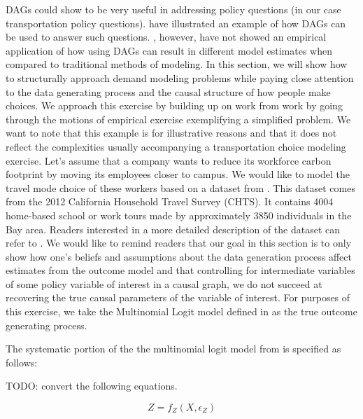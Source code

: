DAGs could show to be very useful in addressing policy questions (in our case transportation policy questions).
\citet{brathwaite_2018_causal} have illustrated an example of how DAGs can be used to answer such questions.
\citet{brathwaite_2018_causal}, however, have not showed an empirical application of how using DAGs can result in 
different model estimates when compared to traditional methods of modeling.
In this section, we will show how to structurally approach demand modeling problems while paying close 
attention to the data generating process and the causal structure of how people make choices.
We approach this exercise by building up on work from \citet{brathwaite_2018_causal} work by going through 
the motions of empirical exercise exemplifying a simplified problem.
We want to note that this example is for illustrative reasons and that it does not reflect the complexities 
usually accompanying a transportation choice modeling exercise.
Let's assume that a company wants to reduce its workforce carbon footprint by moving its employees closer to campus.
We would like to model the travel mode choice of these workers based on a dataset from \citet{brathwaite-asymmetric}.
This dataset comes from the 2012 California Household Travel Survey (CHTS).
It contains 4004 home-based school or work tours made by approximately 3850 individuals in the Bay area. 
Readers interested in a more detailed description of the dataset can refer to \citet{brathwaite-asymmetric}. 
We would like to remind readers that our goal in this section is to only show how one's beliefs and assumptions about the data generation
process affect estimates from the outcome model and that controlling for intermediate variables of 
some policy variable of interest in a causal graph,
we do not succeed at recovering the true causal parameters of the variable of interest.
For purposes of this exercise, we take the Multinomial Logit model defined in \citet{brathwaite-asymmetric} as the true outcome generating process.

The systematic portion of the the multinomial logit model from \citet{brathwaite-asymmetric} is specified as follows:

TODO: convert the following equations.

\[Z = f_Z(X, \epsilon_Z)  \]

